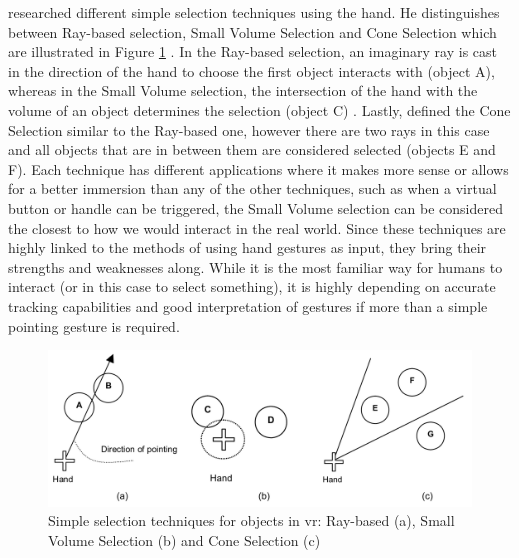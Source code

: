 \cite{Steed2006} researched different simple selection techniques using the hand. He distinguishes between Ray-based selection, Small Volume Selection and Cone Selection which are illustrated in Figure \ref{fig:selectiontechniques} \citep{Steed2006}. In the Ray-based selection, an imaginary ray is cast in the direction of the hand to choose the first object interacts with (object A), whereas in the Small Volume selection, the intersection of the hand with the volume of an object determines the selection (object C) \citep{Steed2006}. Lastly, \cite{Steed2006} defined the Cone Selection similar to the Ray-based one, however there are two rays in this case and all objects that are in between them are considered selected (objects E and F). \newline
Each technique has different applications where it makes more sense or allows for a better immersion than any of the other techniques, such as when a virtual button or handle can be triggered, the Small Volume selection can be considered the closest to how we would interact in the real world. \newline
Since these techniques are highly linked to the methods of using hand gestures as input, they bring their strengths and weaknesses along. While it is the most familiar way for humans to interact (or in this case to select something), it is highly depending on accurate tracking capabilities and good interpretation of gestures if more than a simple pointing gesture is required.
\begin{figure}[h]
	\begin{center}
		\includegraphics[width=14cm]{03_Figures/05_LitReview/Steed2006_SelectionTechniques.png}
		\caption[Simple selection techniques for objects in \gls{vr}: Ray-based, Small Volume Selection and Cone Selection]{Simple selection techniques for objects in \gls{vr}: Ray-based (a), Small Volume Selection (b) and Cone Selection (c) \citep{Steed2006}}
		\label{fig:selectiontechniques}
	\end{center}
\end{figure}


